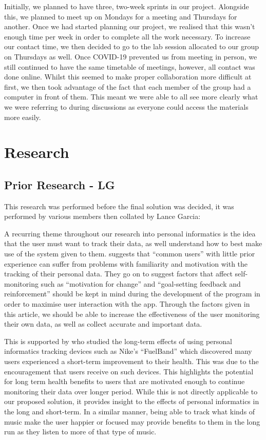 \documentclass[11pt]{report}
\begin{document}
Initially, we planned to have three, two-week sprints in our project. Alongside this, we planned to meet up on Mondays for a meeting and Thursdays for another. Once we had started planning our project, we realised that this wasn’t enough time per week in order to complete all the work necessary. To increase our contact time, we then decided to go to the lab session allocated to our group on Thursdays as well. Once COVID-19 prevented us from meeting in person, we still continued to have the same timetable of meetings, however, all contact was done online. Whilst this seemed to make proper collaboration more difficult at first, we then took advantage of the fact that each member of the group had a computer in front of them. This meant we were able to all see more clearly what we were referring to during discussions as everyone could access the materials more easily.



\chapter{Research}


\section{Prior Research - LG}

This research was performed before the final solution was decided, it was performed by various members then collated by Lance Garcia:\newline

A recurring theme throughout our research into personal informatics is the idea that the user must want to track their data, as well understand how to best make use of the system given to them. \cite{Rapp2014a} suggests that “common users” with little prior experience can suffer from problems with familiarity and motivation with the tracking of their personal data. They go on to suggest factors that affect self-monitoring such as “motivation for change” and “goal-setting feedback and reinforcement” should be kept in mind during the development of the program in order to maximise user interaction with the app. Through the factors given in this article, we should be able to increase the effectiveness of the user monitoring their own data, as well as collect accurate and important data.

This is supported by \cite{Fritz2014} who studied the long-term effects of using personal informatics tracking devices such as Nike’s “FuelBand” which discovered many users experienced a short-term improvement to their health. This was due to the encouragement that users receive on such devices. This highlights the potential for long term health benefits to users that are motivated enough to continue monitoring their data over longer period. While this is not directly applicable to our proposed solution, it provides insight to the effects of personal informatics in the long and short-term. In a similar manner, being able to track what kinds of music make the user happier or focused may provide benefits to them in the long run as they listen to more of that type of music.
\end{document}
